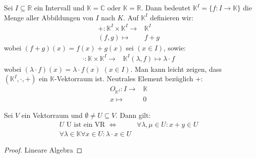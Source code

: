 
\begin{Bemerkung}{
	Sei $I \subseteq \mathbb{R}$ ein Intervall und $\mathbb{K} = \mathbb{C}$ oder
	$\mathbb{K} = \mathbb{R}$. Dann bedeutet $\mathbb{K}^I = \{f: I \rightarrow 
	\mathbb{K}\}$ die Menge aller Abbildungen von $I$ nach $K$. Auf $\mathbb{K}^I$ 
	definieren wir:
	\begin{align*}
		+ : \mathbb{K}^I \times \mathbb{K}^I \rightarrow & \mathbb{K}^I \\
		(f,g) \mapsto & f + g
	\end{align*}
	wobei $(f+g)(x) = f(x)+g(x)$ sei $(x \in I)$, sowie:
	\begin{align*}
		\cdot : \mathbb{K} \times \mathbb{K}^I \rightarrow & \mathbb{K}^I
		(\lambda, f) \mapsto \lambda \cdot f
	\end{align*}
	wobei $(\lambda \cdot f)(x) = \lambda \cdot f(x)$ $(x \in I)$.
	Man kann leicht zeigen, dass $(\mathbb{K}^I, \cdot, +)$ ein 
	$\mathbb{K}$-Vektorraum ist. Neutrales Element bezüglich $+$:
	\begin{align*}
		O_{\mathbb{K}^I} : I \rightarrow & \mathbb{K} \\
		x \mapsto & 0
	\end{align*}
}\end{Bemerkung}

\begin{Satz}{
	Sei $V$ ein Vektorraum und $\emptyset \neq U \subseteq V$. Dann gilt:
	\begin{align*}
		U \text{ U ist ein VR } \Leftrightarrow &
		\forall \lambda, \mu \in U : x + y \in U \\
		\forall \lambda \in \mathbb{K} \forall x \in U: \lambda \cdot x \in U
	\end{align*}
}\end{Satz}
\begin{proof}
	Lineare Algebra
\end{proof}

